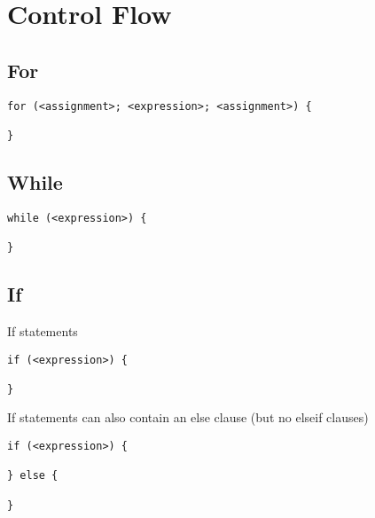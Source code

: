 \documentclass[11pt, oneside]{article}   	%
\begin{document}
\section{Control Flow}


\subsection{For}
\begin{lstlisting}
for (<assignment>; <expression>; <assignment>) {

}
\end{lstlisting}

\subsection{While}

\begin{lstlisting}
while (<expression>) {

}
\end{lstlisting}


\subsection{If}
If statements 

\begin{lstlisting}
if (<expression>) {

}
\end{lstlisting}

If statements can also contain an else clause (but no elseif clauses)
\begin{lstlisting}
if (<expression>) {

} else {

}
\end{lstlisting}
\end{document}
